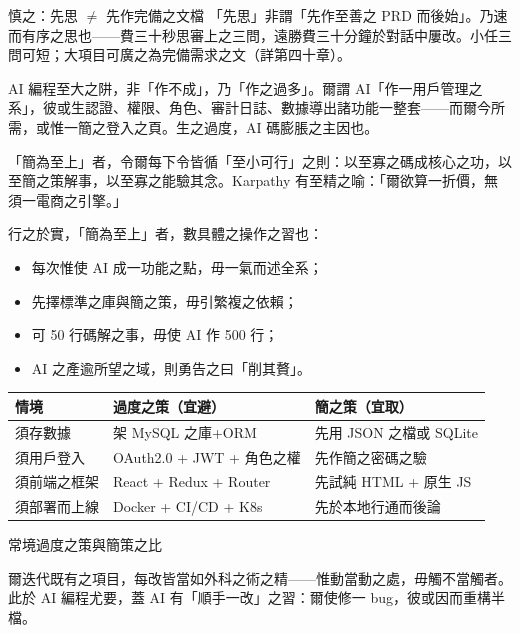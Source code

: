 \begin{tcbwarn}{慎之：先思 $\neq$ 先作完備之文檔}
「先思」非謂「先作至善之 PRD 而後始」。乃速而有序之思也——費三十秒思審上之三問，遠勝費三十分鐘於對話中屢改。小任三問可短；大項目可廣之為完備需求之文（詳第四十章）。

\end{tcbwarn}


AI 編程至大之阱，非「作不成」，乃「作之過多」。爾謂 AI「作一用戶管理之系」，彼或生認證、權限、角色、審計日誌、數據導出諸功能一整套——而爾今所需，或惟一簡之登入之頁。生之過度，AI 碼膨脹之主因也。

「簡為至上」者，令爾每下令皆循「至小可行」之則：以至寡之碼成核心之功，以至簡之策解事，以至寡之能驗其念。Karpathy 有至精之喻：「爾欲算一折價，無須一電商之引擎。」

行之於實，「簡為至上」者，數具體之操作之習也：

\begin{itemize}
  \item 每次惟使 AI 成一功能之點，毋一氣而述全系；
  \item 先擇標準之庫與簡之策，毋引繁複之依賴；
  \item 可 50 行碼解之事，毋使 AI 作 500 行；
  \item AI 之產逾所望之域，則勇告之曰「削其贅」。
\end{itemize}

\begin{center}
\begin{tabularx}{\linewidth}{|X|X|X|}
\hline
\textbf{情境} & \textbf{過度之策（宜避）} & \textbf{簡之策（宜取）} \tabularnewline
\hline
須存數據 & 架 MySQL 之庫+ORM & 先用 JSON 之檔或 SQLite \tabularnewline
須用戶登入 & OAuth2.0 + JWT + 角色之權 & 先作簡之密碼之驗 \tabularnewline
須前端之框架 & React + Redux + Router & 先試純 HTML + 原生 JS \tabularnewline
須部署而上線 & Docker + CI/CD + K8s & 先於本地行通而後論 \tabularnewline
\hline
\end{tabularx}
\end{center}

\begin{center}\small\color{gray}常境過度之策與簡策之比\end{center}


爾迭代既有之項目，每改皆當如外科之術之精——惟動當動之處，毋觸不當觸者。此於 AI 編程尤要，蓋 AI 有「順手一改」之習：爾使修一 bug，彼或因而重構半檔。


